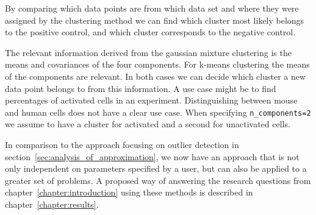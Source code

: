 By comparing which data points are from which data set and where they were assigned by the clustering method we can find which cluster most likely belongs to the positive control, and which cluster corresponds to the negative control.

The relevant information derived from the gaussian mixture clustering is the means and covariances of the four components. For k-means clustering the means of the components are relevant. In both cases we can decide which cluster a new data point belongs to from this information. A use case might be to find percentages of activated cells in an experiment. Distinguishing between mouse and human cells does not have a clear use case. When specifying \texttt{n\_components=2} we assume to have a cluster for activated and a second for unactivated cells.

In comparison to the approach focusing on outlier detection in section~\ref{sec:analysis_of_approximation}, we now have an approach that is not only independent on parameters specified by a user, but can also be applied to a greater set of problems. A proposed way of answering the research questions from chapter~\ref{chapter:introduction} using these methods is described in chapter~\ref{chapter:results}.